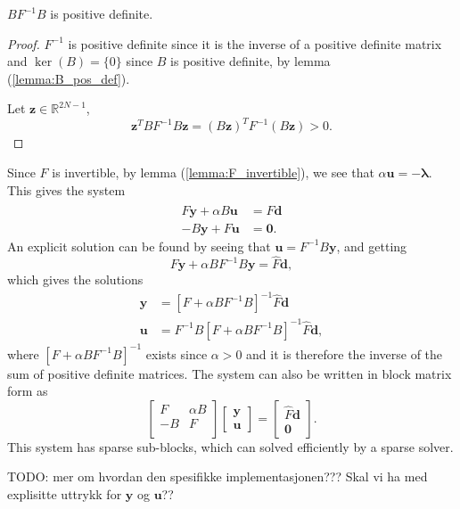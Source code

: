 \begin{lemma}
    $BF^{-1}B$ is positive definite.
\end{lemma}
\begin{proof}
    $F^{-1}$ is positive definite since it is the inverse of a positive definite matrix and $\ker(B) = \{0\}$ since $B$ is positive definite, by lemma (\ref{lemma:B_pos_def}).
    
    Let $\mathbf{z} \in \mathds{R}^{2N-1}$,
    $$\mathbf{z}^T BF^{-1}B \mathbf{z} = (B\mathbf{z})^T F^{-1}(B\mathbf{z}) > 0.$$
\end{proof}
Since $F$ is invertible, by lemma (\ref{lemma:F_invertible}), we see that $\alpha \mathbf{u}= -\mathbf{\lambda}$. 
This gives the system
\begin{align}
    \label{eq:lagrange_conditions}
     F \mathbf{y} + \alpha B \mathbf{u} &= \hat{F}\mathbf{d} \\
    -B \mathbf{y} + F \mathbf{u} &= \mathbf{0}.
\end{align}
An explicit solution can be found by seeing that $\mathbf{u}=F^{-1}B \mathbf{y}$, and getting
$$ F\mathbf{y} + \alpha B F^{-1}B \mathbf{y} = \hat{F}\mathbf{d},$$
which gives the solutions
\begin{align*}
    \mathbf{y} &= \left[F + \alpha B F^{-1}B \right]^{-1} \hat{F}\mathbf{d} \\
    \mathbf{u} &= F^{-1} B \left[F + \alpha B F^{-1}B \right]^{-1} \hat{F}\mathbf{d},
\end{align*}
where $\left[F + \alpha B F^{-1}B \right]^{-1}$ exists since $\alpha > 0$ and it is therefore the inverse of the sum of positive definite matrices.
The system can also be written in block matrix form as
$$
\begin{bmatrix}
   F & \alpha B \\
   -B & F \\
\end{bmatrix}
\begin{bmatrix}
    \mathbf{y} \\
    \mathbf{u}
\end{bmatrix}
= 
\begin{bmatrix} \hat{F}\mathbf{d} \\
    \mathbf{0}
\end{bmatrix}.
$$
This system has sparse sub-blocks, which can solved
efficiently by a sparse solver.

TODO: mer om hvordan den spesifikke implementasjonen??? Skal vi ha med explisitte uttrykk for $\mathbf{y}$ og $\mathbf{u}$??

